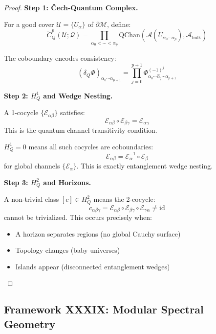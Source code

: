 \documentclass[12pt,a4paper]{article}
\begin{document}
\begin{proof}
\textbf{Step 1: \v{C}ech-Quantum Complex.}

For a good cover $\mathcal{U} = \{U_\alpha\}$ of $\partial\mathcal{M}$, define:
\begin{equation}
\check{C}^p_Q(\mathcal{U}; \mathcal{Q}) = \prod_{\alpha_0 < \cdots < \alpha_p} \text{QChan}(\mathcal{A}(U_{\alpha_0 \cdots \alpha_p}), \mathcal{A}_{\text{bulk}})
\end{equation}

The coboundary encodes consistency:
\begin{equation}
(\delta_Q \Phi)_{\alpha_0 \cdots \alpha_{p+1}} = \prod_{j=0}^{p+1} \Phi_{\alpha_0 \cdots \hat{\alpha}_j \cdots \alpha_{p+1}}^{(-1)^j}
\end{equation}

\textbf{Step 2: $H^1_Q$ and Wedge Nesting.}

A 1-cocycle $\{\mathcal{E}_{\alpha\beta}\}$ satisfies:
\begin{equation}
\mathcal{E}_{\alpha\beta} \circ \mathcal{E}_{\beta\gamma} = \mathcal{E}_{\alpha\gamma}
\end{equation}
This is the quantum channel transitivity condition.

$H^1_Q = 0$ means all such cocycles are coboundaries:
\begin{equation}
\mathcal{E}_{\alpha\beta} = \mathcal{E}_\alpha^{-1} \circ \mathcal{E}_\beta
\end{equation}
for global channels $\{\mathcal{E}_\alpha\}$. This is exactly entanglement wedge nesting.

\textbf{Step 3: $H^2_Q$ and Horizons.}

A non-trivial class $[c] \in H^2_Q$ means the 2-cocycle:
\begin{equation}
c_{\alpha\beta\gamma} = \mathcal{E}_{\alpha\beta} \circ \mathcal{E}_{\beta\gamma} \circ \mathcal{E}_{\gamma\alpha} \neq \text{id}
\end{equation}
cannot be trivialized. This occurs precisely when:
\begin{itemize}
    \item A horizon separates regions (no global Cauchy surface)
    \item Topology changes (baby universes)
    \item Islands appear (disconnected entanglement wedges)
\end{itemize}
\end{proof}

\subsection{Framework XXXIX: Modular Spectral Geometry}
\end{document}
